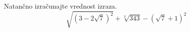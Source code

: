 \documentclass[addpoints]{exam}
\begin{document}
\begin{questions}

    
    
















    \question[5]
    Natančno izračunajte vrednost izraza.
    $$ \sqrt{\left(3-2\sqrt{7}\right)^2}+\sqrt[3]{343}-\left(\sqrt{7}+1\right)^2 $$


\end{questions}
\end{document}
